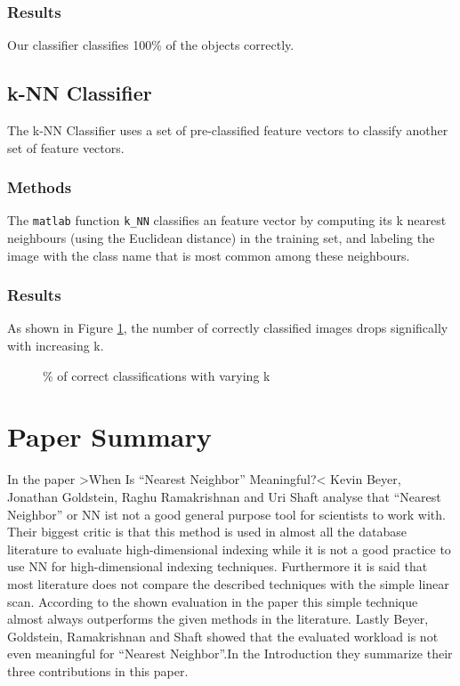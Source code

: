 \documentclass[a4paper,psfig,subfigure,epsfig,fleqn,amssmb,float,caption,fontenc,ausarbeitung]{article}
\begin{document}
\subsubsection{Results}
\label{sec:ownResults}
Our classifier classifies 100\% of the objects correctly.

\subsection{k-NN Classifier}
\label{sec:kNN}
The k-NN Classifier uses a set of pre-classified feature vectors to classify another set of feature vectors.

\subsubsection{Methods}
\label{sec:kNNMethods}
The {\tt matlab} function {\tt k\_NN} classifies an feature vector by computing its k nearest neighbours (using the Euclidean distance) in the training set, and labeling the image with the class name that is most common among these neighbours.

\subsubsection{Results}
\label{sec:kNNResults}
As shown in Figure \ref{fig:results}, the number of correctly classified images drops significally with increasing k.
\begin{figure}
	\centering
	\setlength\figureheight{7cm} 
	\setlength\figurewidth{9cm}
	
	\caption{\% of correct classifications with varying k}
	\label{fig:results}
\end{figure}

\section{Paper Summary}
\label{sec:paperSummary}
\cite{beyer1999nearest}

In the paper >When Is “Nearest Neighbor” Meaningful?< Kevin Beyer, Jonathan Goldstein, Raghu Ramakrishnan and Uri Shaft analyse that “Nearest Neighbor” or NN ist not a good general purpose tool for scientists to work with. Their biggest critic is that this method is used in almost all the database literature to evaluate high-dimensional indexing while it is not a good practice to use NN for high-dimensional indexing techniques. Furthermore it is said that most literature does not compare the described techniques with the simple linear scan. According to the shown evaluation in the paper this simple technique almost always outperforms the given methods in the literature. Lastly Beyer, Goldstein, Ramakrishnan and Shaft showed that the evaluated workload is not even meaningful for “Nearest Neighbor”.In the Introduction they summarize their three contributions in this paper. 
\end{document}
